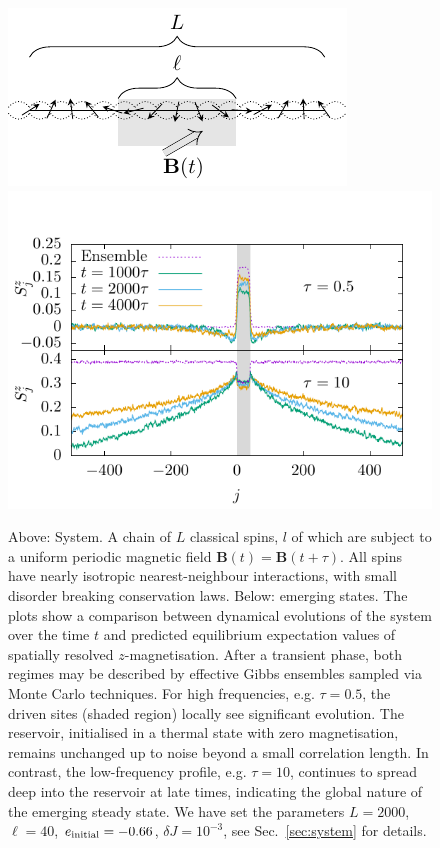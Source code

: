 \documentclass[aps,pre,twocolumn,notitlepage,floats,10pt]{revtex4-1}
\begin{document}
\begin{figure}[ht!]
  \includegraphics[width=.95\linewidth]{figs/fig-1-sketch.pdf}
  \includegraphics[width=0.95\linewidth]{figs/fig-1-profile-comparison.pdf}
  \caption{
  Above: System.
  A chain of $L$ classical spins, $l$ of which are subject to a uniform periodic
  magnetic field $\mathbf{B}(t)=\mathbf{B}(t+\tau)$.
  All spins have nearly isotropic nearest-neighbour interactions, with small
  disorder breaking conservation laws.
  Below: emerging states.
  The plots show a comparison between dynamical evolutions of the system over the
  time $t$ and predicted equilibrium expectation values of spatially resolved
  $z$-magnetisation.
  After a transient phase, both regimes may be described by effective Gibbs
  ensembles sampled via Monte Carlo techniques.
  For high frequencies, e.g. $\tau=0.5$, the driven sites (shaded region) locally
  see significant evolution.
  The reservoir, initialised in a thermal state with zero magnetisation, remains
  unchanged up to noise beyond a small correlation length.
  In contrast, the low-frequency profile, e.g. $\tau=10$, continues to spread deep
  into the reservoir at late times, indicating the global nature of the emerging
  steady state.
  We have set the parameters $L=2000$, $\ell=40$, $e_{\rm initial}=-0.66$,
  $\delta J=10^{-3}$, see Sec.~\ref{sec:system} for details.
  }
  \label{fig:sketch}
\end{figure}
\end{document}
